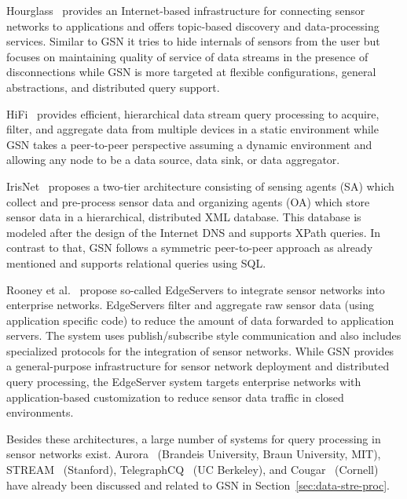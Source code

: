 Hourglass~\cite{Shneidman04} provides an Internet-based infrastructure for
connecting sensor networks to applications and offers topic-based discovery and
data-processing services. Similar to GSN it tries to hide internals of sensors
from the user but focuses on maintaining quality of service of data streams in
the presence of disconnections while GSN is more targeted at flexible
configurations, general abstractions, and distributed query support.

HiFi~\cite{Franklin05} provides efficient, hierarchical data stream query
processing to acquire, filter, and aggregate data from multiple devices in a
static environment while GSN takes a peer-to-peer perspective assuming a
dynamic environment and allowing any node to be a data source, data sink, or
data aggregator.

IrisNet~\cite{Gibbons03} proposes a two-tier architecture consisting of sensing
agents (SA) which collect and pre-process sensor data and organizing agents
(OA) which store sensor data in a hierarchical, distributed XML database. This
database is modeled after the design of the Internet DNS and supports XPath
queries. In contrast to that, GSN follows a symmetric peer-to-peer approach as
already mentioned and supports relational queries using SQL.

Rooney et al.~\cite{Rooney06} propose so-called EdgeServers to integrate sensor
networks into enterprise networks. EdgeServers filter and aggregate raw sensor
data (using application specific code) to reduce the amount of data forwarded
to application servers. The system uses publish/subscribe style communication
and also includes specialized protocols for the integration of sensor
networks. While GSN provides a general-purpose infrastructure for sensor
network deployment and distributed query processing, the EdgeServer system
targets enterprise networks with application-based customization to reduce
sensor data traffic in closed environments.

Besides these architectures, a large number of systems for query processing in
sensor networks exist. Aurora~\cite{Cherniack03} (Brandeis University, Braun
University, MIT), STREAM~\cite{Arasu06} (Stanford),
TelegraphCQ~\cite{Chandrasekaran03} (UC Berkeley), and Cougar~\cite{Yao03}
(Cornell) have already been discussed and related to GSN in
Section~\ref{sec:data-stre-proc}.


